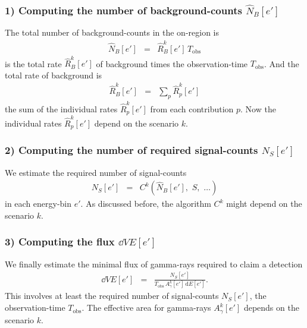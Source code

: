\documentclass{article}%
\begin{document}
\subsubsection*{1) Computing the number of background-counts $\hat{N}_B[e']$}
%
The total number of background-counts in the on-region is
%
\begin{eqnarray}
\hat{N}_B[e'] &=& \hat{R}^k_B[e'] \, T_\text{obs}
\end{eqnarray}
%
is the total rate $\hat{R}^k_B[e']$ of background times the observation-time $T_\text{obs}$.
%
And the total rate of background is
%
\begin{eqnarray}
\hat{R}^k_B[e'] &=& \sum_{p} \hat{R}^k_p[e']
\end{eqnarray}
%
the sum of the individual rates $\hat{R}^k_p[e']$ from each contribution $p$.
%
Now the individual rates $\hat{R}^k_p[e']$ depend on the scenario $k$.
%
\subsubsection*{2) Computing the number of required signal-counts $N_S[e']$}
%
We estimate the required number of signal-counts
\begin{eqnarray}
N_S[e'] &=& C^k(\hat{N}_B[e'],\,\,S,\,\,\dots)
\end{eqnarray}
in each energy-bin $e'$. As discussed before, the algorithm $C^k$ might depend on the scenario $k$.
%
\subsubsection*{3) Computing the flux $\dd{V}{E}[e']$}
%
We finally estimate the minimal flux of gamma-rays required to claim a detection
%
\begin{eqnarray}
\dd{V}{E}[e'] &=& \frac{N_S[e']}{{T_\text{obs}}\,{A^k_\gamma}[e']\,\text{d}E[e']}.
\end{eqnarray}
%
This involves at least the required number of signal-counts $N_S[e']$, the observation-time $T_\text{obs}$.
%
The effective area for gamma-rays $A^k_\gamma[e']$ depends on the scenario $k$.
%
\end{document}
